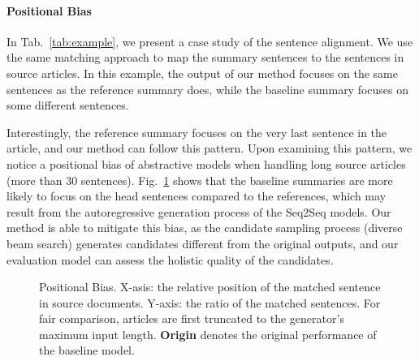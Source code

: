 \documentclass[11pt,a4paper]{article}
\begin{document}
\paragraph{Positional Bias} In Tab.~\ref{tab:example}, we present a case study of the sentence alignment. 
We use the same matching approach to map the summary sentences to the sentences in source articles.
In this example, the output of our method focuses on the same sentences as the reference summary does, while the baseline summary focuses on some different sentences. 

Interestingly, the reference summary focuses on the very last sentence in the article, and our method can follow this pattern.
Upon examining this pattern, we notice a positional bias of abstractive models when handling long source articles (more than 30 sentences).
Fig.~\ref{fig:bias} shows that the baseline summaries are more likely to focus on the head sentences compared to the references, which may result from the autoregressive generation process of the Seq2Seq models.
Our method is able to mitigate this bias, as the candidate sampling process (diverse beam search) generates candidates different from the original outputs, and our evaluation model can assess the holistic quality of the candidates.

\begin{figure}
    \centering
    \caption{Positional Bias. X-asis: the relative position of the matched sentence in source documents. Y-axis: the ratio of the matched sentences. For fair comparison, articles are first truncated to the generator's maximum input length. \textbf{Origin} denotes the original performance of the baseline model.}
    \label{fig:bias}
\end{figure}
\end{document}
